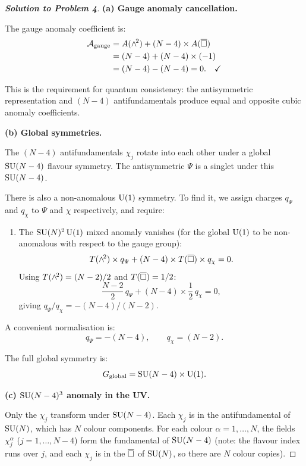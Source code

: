 \documentclass[11pt,a4paper]{article}
\begin{document}
\begin{proof}[\textbf{Solution to Problem 4}]

\textbf{(a) Gauge anomaly cancellation.}

The gauge anomaly coefficient is:
\begin{align}
  \mathcal{A}_{\text{gauge}}
  &= A(\wedge^{\!2}) + (N-4) \times A(\overline{\square}) \nonumber \\
  &= (N-4) + (N-4) \times (-1) \nonumber \\
  &= (N-4) - (N-4) = 0. \quad\checkmark
\end{align}

This is the requirement for quantum consistency: the antisymmetric
representation and $(N-4)$ antifundamentals produce equal and opposite
cubic anomaly coefficients.

\textbf{(b) Global symmetries.}

The $(N-4)$ antifundamentals $\chi_j$ rotate into each other under a
global $\mathrm{SU}(N-4)$ flavour symmetry.  The antisymmetric $\Psi$ is a
singlet under this $\mathrm{SU}(N-4)$.

There is also a non-anomalous $\mathrm{U}(1)$ symmetry.  To find it, we
assign charges $q_\Psi$ and $q_\chi$ to $\Psi$ and $\chi$ respectively,
and require:
\begin{enumerate}[label=(\roman*)]
  \item The $\mathrm{SU}(N)^2\,\mathrm{U}(1)$ mixed anomaly vanishes (for the global
    $\mathrm{U}(1)$ to be non-anomalous with respect to the gauge group):
    \[
      T(\wedge^{\!2}) \times q_\Psi + (N-4) \times T(\overline{\square}) \times q_\chi = 0.
    \]
    Using $T(\wedge^{\!2}) = (N-2)/2$ and $T(\overline{\square}) = 1/2$:
    \[
      \frac{N-2}{2}\,q_\Psi + (N-4) \times \frac{1}{2}\,q_\chi = 0,
    \]
    giving $q_\Psi / q_\chi = -(N-4)/(N-2)$.
\end{enumerate}

A convenient normalisation is:
\begin{equation}
  q_\Psi = -(N-4), \qquad q_\chi = (N-2).
\end{equation}

The full global symmetry is:
\begin{equation}
  G_{\text{global}} = \mathrm{SU}(N-4) \times \mathrm{U}(1).
\end{equation}

\textbf{(c) $\mathrm{SU}(N-4)^3$ anomaly in the UV.}

Only the $\chi_j$ transform under $\mathrm{SU}(N-4)$.  Each $\chi_j$ is in the
antifundamental of $\mathrm{SU}(N)$, which has $N$ colour components.  For each
colour $\alpha = 1,\ldots,N$, the fields $\chi_j^\alpha$
($j = 1,\ldots,N-4$) form the fundamental of $\mathrm{SU}(N-4)$ (note: the
flavour index runs over $j$, and each $\chi_j$ is in the $\overline{\square}$ of
$\mathrm{SU}(N)$, so there are $N$ colour copies).


\end{proof}
\end{document}
